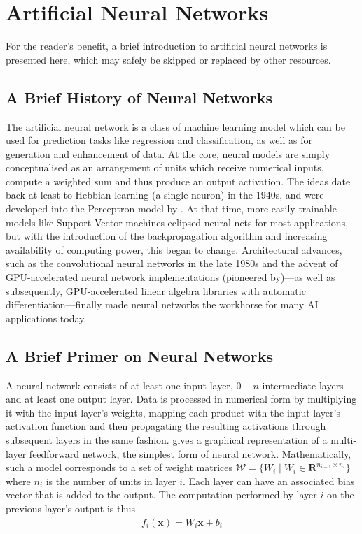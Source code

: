 \hypertarget{sec:anns}{%
\section{Artificial Neural Networks}\label{sec:anns}}

For the reader's benefit, a brief introduction to artificial neural networks is
presented here, which may safely be skipped or replaced by other resources.

\subsection*{A Brief History of Neural Networks}%

The artificial neural network is a class of machine learning model which can be
used for prediction tasks like regression and classification, as well as for
generation and enhancement of data.  At the core, neural models are simply
conceptualised as an arrangement of units which receive numerical inputs,
compute a weighted sum and thus produce an output activation. The ideas date
back at least to Hebbian learning (a single neuron) in the 1940s, and were
developed into the Perceptron model by \citet{Rosenblatt58theperceptron}. At
that time, more easily trainable models like Support Vector machines eclipsed
neural nets for most applications, but with the introduction of the
backpropagation algorithm \citep{werbos1975beyond} and increasing availability
of computing power, this began to change.  Architectural advances, such as the
convolutional neural networks in the late 1980s \citep{lecun1989generalization,
LeCun:1989:BAH:1351079.1351090} and the advent of GPU-accelerated neural
network implementations (pioneered by\cite{Ciresan11flexible})---as well as
subsequently, GPU-accelerated linear algebra libraries with automatic
differentiation---finally made neural networks the workhorse for many AI
applications today.

\subsection*{A Brief Primer on Neural Networks}%

A neural network consists of at least one input layer, \(0-n\)
intermediate layers and at least one output layer. Data is processed in
numerical form by multiplying it with the input layer's weights, mapping
each product with the input layer's activation function and then
propagating the resulting activations through subsequent layers in the
same fashion.  gives a graphical representation of a
multi-layer feedforward network, the simplest form of neural network.
Mathematically, such a model corresponds to a set of weight matrices
$\mathcal{W} = \{W_i \mid W_i \in \mathbf{R}^{n_{i-1} \times n_i}\}$ where $n_i$
is the number of units in layer $i$. Each layer can have an associated bias
vector that is added to the output. The computation performed by layer $i$ on
the previous layer's output is
thus
\begin{align}
    f_i(\mathbf{x}) = W_i \mathbf{x} + b_i
\end{align}

